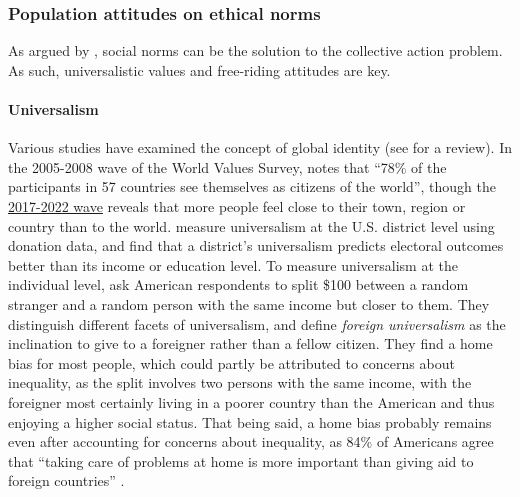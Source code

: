 
\subsubsection{Population attitudes on ethical norms}\label{subsubsec:literature_wealth_tax}
As argued by , social norms can be the solution to the collective action problem. As such, universalistic values and free-riding attitudes are key. %

\paragraph{Universalism}
Various studies have examined the concept of global identity (see %
 for a review). In the 2005-2008 wave of the World Values Survey,  notes that ``78\% of the participants in 57 countries see themselves as citizens of the world'', though the \href{https://www.worldvaluessurvey.org/WVSDocumentationWV7.jsp}{2017-2022 wave} reveals that more people feel close to their town, region or country than to the world.  measure universalism at the U.S. district level using donation data, and find that a district's universalism predicts electoral outcomes better than its income or education level. To measure universalism at the individual level,  ask American respondents to split \$100 between a random stranger and a random person with the same income but closer to them. They distinguish different facets of universalism, and define \textit{foreign universalism} as the inclination to give to a foreigner rather than a fellow citizen. They find a home bias for most people, which could partly be attributed to concerns about inequality, as the split involves two persons with the same income, with the foreigner most certainly living in a poorer country than the American and thus enjoying a higher social status. 
That being said, a home bias probably remains even after accounting for concerns about  inequality, as 84\% of Americans agree that ``taking care of problems at home is more important than giving aid to foreign countries'' . 
